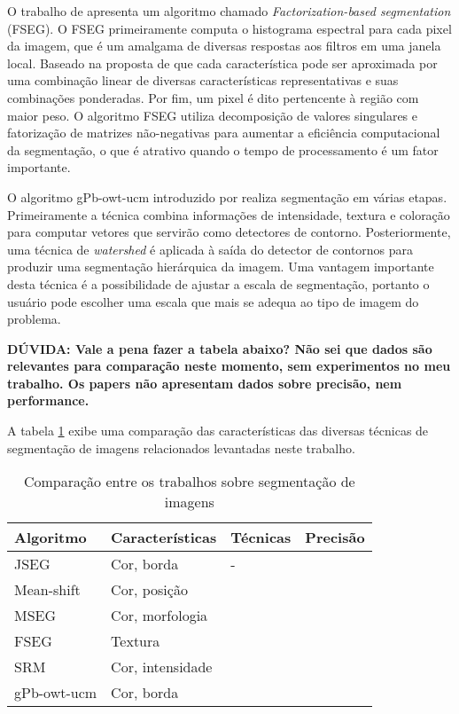 O trabalho de  apresenta um algoritmo chamado \textit{Factorization-based segmentation} (FSEG). O FSEG primeiramente computa o histograma espectral para cada pixel da imagem, que é um amalgama de diversas respostas aos filtros em uma janela local. Baseado na proposta de que cada característica pode ser aproximada por uma combinação linear de diversas características representativas e suas combinações ponderadas. Por fim, um pixel é dito pertencente à região com maior peso. O algoritmo FSEG utiliza decomposição de valores singulares e fatorização de matrizes não-negativas para aumentar a eficiência computacional da segmentação, o que é atrativo quando o tempo de processamento é um fator importante.

O algoritmo gPb-owt-ucm introduzido por  realiza segmentação em várias etapas. Primeiramente a técnica combina informações de intensidade, textura e coloração para computar vetores que servirão como  detectores de contorno. Posteriormente, uma técnica de \textit{watershed} é aplicada à saída do detector de contornos para produzir uma segmentação hierárquica da imagem. Uma vantagem importante desta técnica é a possibilidade de ajustar a escala de segmentação, portanto o usuário pode escolher uma escala que mais se adequa ao tipo de imagem do problema.

\textbf{DÚVIDA: Vale a pena fazer a tabela abaixo? Não sei que dados são relevantes para comparação neste momento, sem experimentos no meu trabalho. Os papers não apresentam dados sobre precisão, nem performance.}

A tabela \ref{tab:sumarioSegmentacao} exibe uma comparação das características das diversas técnicas de segmentação de imagens relacionados levantadas neste trabalho.

\begin{table}[h]
\begin{tabular}{|l|l|l|c|}
\hline
\textbf{Algoritmo} & \textbf{Características} & \textbf{Técnicas} & \textbf{Precisão} \\ \hline
JSEG        & Cor, borda & - & \\ \hline
Mean-shift  & Cor, posição &  & \\ \hline
MSEG        & Cor, morfologia &  & \\ \hline
FSEG        & Textura &  & \\ \hline
SRM         & Cor, intensidade &  & \\ \hline
gPb-owt-ucm & Cor, borda &  & \\ \hline
\end{tabular}
\caption{Comparação entre os trabalhos sobre segmentação de imagens}
\label{tab:sumarioSegmentacao}
\end{table}

